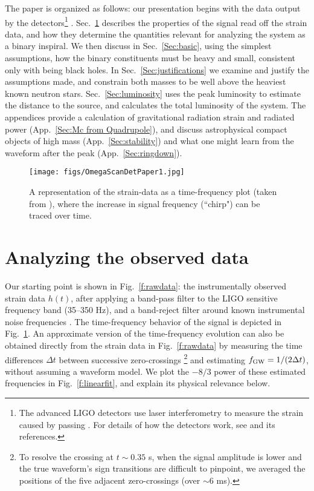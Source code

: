 \documentclass{andp2012}%
\newcommand{\inlinecite}[1]{\cite{#1}}
\newcommand{\refigure}[1]{Fig.~\ref{#1}}
\newcommand{\refapp}[1]{App.\ \ref{#1}}
\newcommand{\refsec}[1]{Sec.\ \ref{#1}}
\def\fgw{f_{\rm GW}}
\begin{document}
The paper is organized as follows:
our presentation begins with the data output by the detectors\footnote{
The advanced LIGO detectors use laser interferometry to measure the strain
caused by passing \GWsns.
For details of how the detectors work,
see \inlinecite{DetectionPaper} and its references.}
.
\refsec{Sec:data} describes the properties of the signal read off the strain data,
and how they determine the quantities relevant for analyzing the system as a binary inspiral.
We then discuss in \refsec{Sec:basic}, using the simplest assumptions,
how the binary constituents must be heavy and small, consistent only with being black holes.
In \refsec{Sec:justifications}
we examine and justify the assumptions made,
and constrain both masses to be well above the heaviest known neutron stars.
\refsec{Sec:luminosity} uses the peak \GW luminosity
to estimate the distance to the source,
and calculates the total luminosity of the system.
The appendices provide a calculation of gravitational radiation strain and radiated power (\refapp{Sec:Mc from Quadrupole}),
and discuss astrophysical compact objects of high mass (\refapp{Sec:stability})
and what one might learn from the waveform after the peak (\refapp{Sec:ringdown}).

\begin{figure}[h!]
\centering
\texttt{[image: figs/OmegaScanDetPaper1.jpg]}
\caption{A representation of the strain-data as a time-frequency
		   plot (taken from \inlinecite{DetectionPaper}),
		   where the increase in signal frequency (``chirp")
		   can be traced over time.}
\label{f:time-freq-plot}
\end{figure}

\section{Analyzing the observed data}
\label{Sec:data}

Our starting point is shown in \refigure{f:rawdata}:
the instrumentally observed strain data $h(t)$,
after applying a band-pass filter to the LIGO sensitive frequency band (35--350 Hz),
and a band-reject filter around known instrumental noise frequencies \cite{LOSC}.
The time-frequency behavior of the signal is depicted in \refigure{f:time-freq-plot}.
An approximate version of the time-frequency evolution can also be obtained
directly from the strain data in \refigure{f:rawdata}
by measuring the
time differences $\Delta t$ between
successive zero-crossings
\footnote{
To resolve the crossing at
$t\sim0.35$ s,
when the signal amplitude is lower
and the true waveform's sign transitions
are difficult to pinpoint,
we averaged the positions of the
five adjacent zero-crossings
(over $\sim6$ ms).
}
and estimating
$\fgw=1/(2\Delta t)$,
without assuming a waveform model.
We plot the $-8/3$ power of these estimated frequencies in \refigure{f:linearfit},
and explain its physical relevance below.
\end{document}

